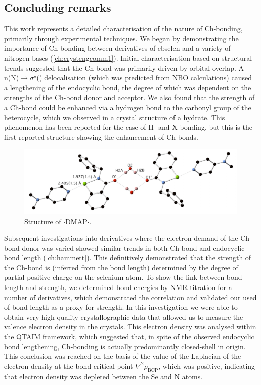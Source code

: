 \begin{refsection}
\chapter{Concluding remarks}\label{ch:conclusion}
This work represents a detailed characterisation of the nature of Ch-bonding, primarily through experimental techniques.
We began by demonstrating the importance of Ch-bonding between derivatives of ebselen  and a variety of nitrogen bases (\cref{ch:crystengcomm1}).
Initial characterisation based on structural trends suggested that the Ch-bond was primarily driven by orbital overlap.
A n(N)$ \rightarrow \sigma^{\star} $() delocalisation (which was predicted from NBO calculations) caused a lengthening of the endocyclic  bond, the degree of which was dependent on the strengths of the Ch-bond donor and acceptor.
We also found that the strength of a Ch-bond could be enhanced via a hydrogen bond to the carbonyl group of the heterocycle, which we observed in a crystal structure of a hydrate.
This phenomenon has been reported for the case of H- and X-bonding\autocite{Riel2019,Gilli1994}, but this is the first reported structure showing the enhancement of Ch-bonds.

\begin{figure}
    \centering
    \includegraphics[width=0.8\linewidth]{Figures/benzyl-dmap-hydrate.pdf}
    \caption{Structure of $ \cdot $DMAP$ \cdot $.}
  \end{figure}

Subsequent investigations into derivatives where the electron demand of the Ch-bond donor was varied showed similar trends in both Ch-bond and endocyclic bond length (\cref{ch:hammett}).
This definitively demonstrated that the strength of the Ch-bond is (inferred from the bond length) determined by the degree of partial positive charge on the selenium atom.
To show the link between bond length and strength, we determined bond energies by NMR titration for a number of derivatives, which demonstrated the correlation and validated our used of bond length as a proxy for strength.
In this investigation we were able to obtain very high quality crystallographic data that allowed us to measure the valence electron density in the crystals.
This electron density was analysed within the QTAIM framework, which suggested that, in spite of the observed endocyclic bond lengthening, Ch-bonding is actually predominantly closed-shell in origin.
This conclusion was reached on the basis of the value of the Laplacian of the electron density at the bond critical point $\nabla^2 \rho_{\text{BCP}}$, which was positive, indicating that electron density was depleted between the Se and N atoms.


\end{refsection}
